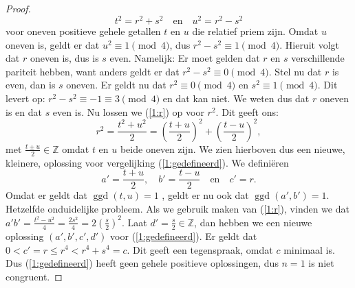 \documentclass[12pt,reqno]{article}
\newcommand*{\ZZ}{\ensuremath{\mathbb{Z}}}
\theoremstyle{theorem}
\theoremstyle{definition}
\DeclareMathOperator{\ggd}{ggd}
\begin{document}
\begin{proof}
\begin{equation}
			t^2 = r^2 + s^2 \quad \text{en} \quad u^2 = r^2 - s^2
		\end{equation}
		voor oneven positieve gehele getallen $t$ en $u$ die relatief priem zijn. Omdat $u$ oneven is, geldt er dat $u^2 \equiv 1 \pmod{4}$, dus $r^2 - s^2 \equiv 1 \pmod{4}$. Hieruit volgt dat $r$ oneven is, dus is $s$ even. Namelijk: Er moet gelden dat $r$ en $s$ verschillende pariteit hebben, want anders geldt er dat $r^2 - s^2 \equiv 0 \pmod{4}$. Stel nu dat $r$ is even, dan is $s$ oneven. Er geldt nu dat $r^2 \equiv 0 \pmod{4}$ en $s^2 \equiv 1 \pmod{4}$. Dit levert op: $r^2 - s^2 \equiv -1 \equiv 3 \pmod{4}$ en dat kan niet. We weten dus dat $r$ oneven is en dat $s$ even is. Nu lossen we  (\ref{1:r}) op voor $r^2$. Dit geeft ons:
		\begin{equation*}
			r^2 = \frac{t^2 + u^2}{2} = \left( \frac{t+u}{2} \right)^2 + \left( \frac{t-u}{2} \right)^2,
		\end{equation*}
		met $\frac{t \pm u}{2} \in\ZZ$ omdat $t$ en $u$ beide oneven zijn. We zien hierboven dus een nieuwe, kleinere, oplossing voor vergelijking (\ref{1:gedefineerd}). We defini\"eren
		\begin{equation*}
			a' = \frac{t+u}{2}, \quad b' = \frac{t-u}{2} \quad \text{en} \quad c' = r.
		\end{equation*}
		Omdat er geldt dat $\ggd(t,u) = 1$ , geldt er nu ook dat $\ggd(a',b') = 1$. {\color{red}Hetzelfde onduidelijke probleem.} Als we gebruik maken van (\ref{1:r}), vinden we dat $a'b' = \frac{t^2 - u^2}{4} = \frac{2s^2}{4} = 2\left( \frac{s}{2} \right)^2$. Laat $d' = \frac{s}{2} \in\ZZ$, dan hebben we een nieuwe oplossing $(a', b', c', d')$ voor (\ref{1:gedefineerd}). Er geldt dat $0 < c'= r \leq r^4 < r^4 + s^4 = c$. Dit geeft een tegenspraak, omdat $c$ minimaal is. Dus (\ref{1:gedefineerd}) heeft geen gehele positieve oplossingen, dus $n=1$ is niet congruent.
	\end{proof}
\end{document}
